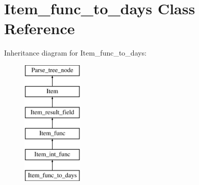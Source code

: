 \hypertarget{classItem__func__to__days}{}\section{Item\+\_\+func\+\_\+to\+\_\+days Class Reference}
\label{classItem__func__to__days}
Inheritance diagram for Item\+\_\+func\+\_\+to\+\_\+days\+:\begin{figure}[H]
\begin{center}
\leavevmode
\includegraphics[height=6.000000cm]{classItem__func__to__days}
\end{center}
\end{figure}
